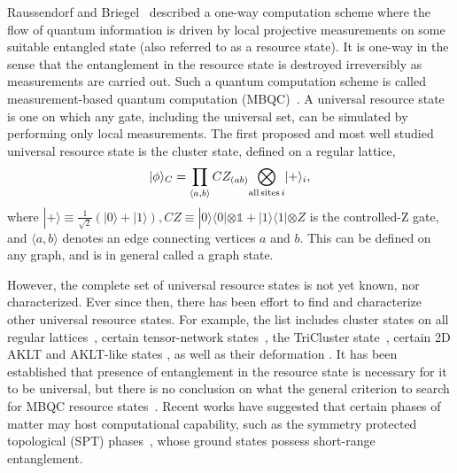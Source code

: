 \documentclass[aps,amsfonts,pra,twocolumn,showpacs]{revtex4-1}
\newcommand{\be}{\begin{equation}}
\newcommand{\ee}{\end{equation}}
\begin{document}
Raussendorf and Briegel~\cite{Raussendorf2001} described a one-way computation scheme where the flow of quantum information is driven by local projective measurements on some suitable entangled state (also referred to as a resource state). It is one-way in the sense that the entanglement in the resource state is destroyed irreversibly as measurements are carried out. Such a quantum computation scheme is called measurement-based quantum computation (MBQC)~\cite{Raussendorf2003, Nielsen2005, Briegel2009, RaussendorfWei}. A universal resource state is one on which any gate, including the universal set, can be simulated by performing only local measurements. The first proposed and most well studied universal resource state is the cluster state, defined on a regular lattice,
	\be
		|\phi\rangle_C = \prod_{\langle a, b\rangle} CZ_{(ab)} \underset{{\rm all \, sites} \, i}{\bigotimes} |+\rangle_i	\label{cluster_state},
	\ee
where $|+\rangle \equiv \frac{1}{\sqrt{2}}(|0\rangle+|1\rangle), CZ \equiv |0\rangle\langle 0| \otimes \mathds{1} + |1\rangle\langle 1| \otimes Z$ is the controlled-Z gate, and $\langle a, b\rangle$ denotes an edge connecting vertices $a$ and $b$. This can be defined on any graph, and is in general called a graph state.

However, the complete set of universal resource states is not yet known, nor characterized. Ever since then, there has been effort to find and characterize other universal resource states. For example, the list includes cluster states on all regular lattices~\cite{VandenNest06}, certain tensor-network states~\cite{Gross2007, Gross2007_1}, the TriCluster state~\cite{TriCluster},  certain 2D AKLT and AKLT-like states \cite{Wei2011,Miyake2011,Wei2012,Wei2014,Wei2015,Cai2010}, as well as their deformation \cite{Darmawan2012, Wei2017}. 
It has been established that presence of entanglement in the resource state is necessary for it to be universal, but there is no conclusion on what the general criterion to search for MBQC resource states~\cite{VandenNest07,Gross09,Bremner09}.
Recent works have suggested that certain phases of matter may host computational capability, such as the
 symmetry protected topological (SPT) phases~\cite{GuWenSPT,ChenComplete,PollmannSPT,SchuchSPT,ChenScience}, whose ground states possess short-range entanglement.
\end{document}
